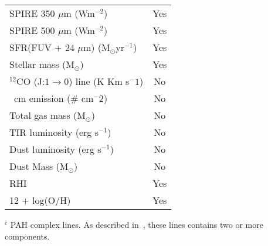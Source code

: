 \begin{table}
\begin{tabular}{ |l|c| }
SPIRE 350 $\mu$m (Wm$^{-2}$)& Yes\\
SPIRE 500 $\mu$m (Wm$^{-2}$)& Yes\\
SFR(FUV + 24 $\mu$m) (M$_{\odot}$yr$^{-1}$) & Yes\\
Stellar mass (M$_{\odot}$)& Yes\\
$^{12}$CO (J:$1\rightarrow0$) line (K Km s$^-1$) & No \\
\hi 21~cm emission ($\#$ cm$^-2$) & No \\
Total gas mass (M$_{\odot}$) & No \\
TIR luminosity (erg s$^{-1}$) & No \\
Dust luminosity (erg s$^{-1}$) & No \\
Dust Mass (M$_{\odot}$)& No\\
RHI & Yes\\
12 + log(O/H)& Yes\\
\hline
\end{tabular}
\begin{tablenotes}
\item $^c$ PAH  complex lines. As described in~\cite{Smith07a}, these lines contains two or more components.
\end{tablenotes}
\end{table}